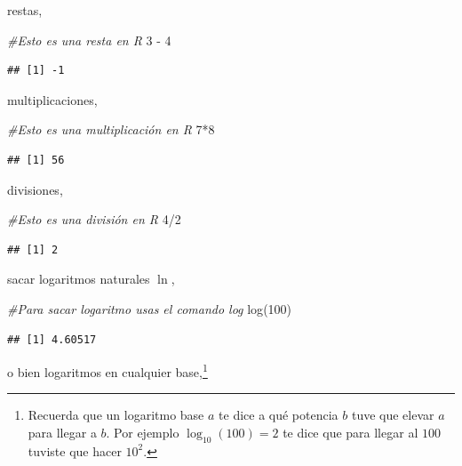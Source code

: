 \documentclass[]{tufte-book}
\newenvironment{Shaded}{}{}
\newcommand{\CommentTok}[1]{\textcolor[rgb]{0.38,0.63,0.69}{\textit{#1}}}
\newcommand{\DecValTok}[1]{\textcolor[rgb]{0.25,0.63,0.44}{#1}}
\newcommand{\FunctionTok}[1]{\textcolor[rgb]{0.02,0.16,0.49}{#1}}
\newcommand{\NormalTok}[1]{#1}
\newcommand{\SpecialCharTok}[1]{\textcolor[rgb]{0.25,0.44,0.63}{#1}}
\begin{document}
restas,

\begin{Shaded}
\begin{Highlighting}[]
\CommentTok{\#Esto es una resta en R}
\DecValTok{3} \SpecialCharTok{{-}} \DecValTok{4}
\end{Highlighting}
\end{Shaded}

\begin{verbatim}
## [1] -1
\end{verbatim}

multiplicaciones,

\begin{Shaded}
\begin{Highlighting}[]
\CommentTok{\#Esto es una multiplicación en R}
\DecValTok{7}\SpecialCharTok{*}\DecValTok{8}
\end{Highlighting}
\end{Shaded}

\begin{verbatim}
## [1] 56
\end{verbatim}

divisiones,

\begin{Shaded}
\begin{Highlighting}[]
\CommentTok{\#Esto es una división en R}
\DecValTok{4}\SpecialCharTok{/}\DecValTok{2}
\end{Highlighting}
\end{Shaded}

\begin{verbatim}
## [1] 2
\end{verbatim}

sacar logaritmos naturales \(\ln\),

\begin{Shaded}
\begin{Highlighting}[]
\CommentTok{\#Para sacar logaritmo usas el comando log}
\FunctionTok{log}\NormalTok{(}\DecValTok{100}\NormalTok{)}
\end{Highlighting}
\end{Shaded}

\begin{verbatim}
## [1] 4.60517
\end{verbatim}

o bien logaritmos en cualquier base,\footnote{Recuerda que un logaritmo
  base \(a\) te dice a qué potencia \(b\) tuve que elevar \(a\) para
  llegar a \(b\). Por ejemplo \(\log_{10}(100) = 2\) te dice que para
  llegar al \(100\) tuviste que hacer \(10^2\).}
\end{document}
